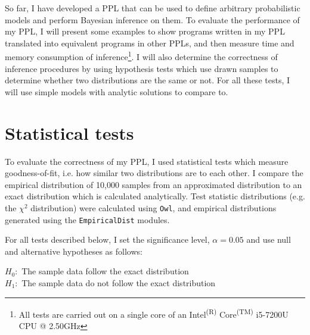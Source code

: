 




So far, I have developed a PPL that can be used to define arbitrary probabilistic models and perform Bayesian inference on them. To evaluate the performance of my PPL, I will present some examples to show programs written in my PPL translated into equivalent programs in other PPLs, and then measure time and memory consumption of inference\footnote{All tests are carried out on a single core of an Intel\textsuperscript{(R)} Core\textsuperscript{(TM)} i5-7200U CPU @ 2.50GHz}. I will also determine the correctness of inference procedures by using hypothesis tests which use drawn samples to determine whether two distributions are the same or not. For all these tests, I will use simple models with analytic solutions to compare to.


\section{Statistical tests}
To evaluate the correctness of my PPL, I used statistical tests which measure goodness-of-fit, i.e. how similar two distributions are to each other. I compare the empirical distribution of 10,000 samples from an approximated distribution to an exact distribution which is calculated analytically. Test statistic distributions (e.g. the $\chi^2$ distribution) were calculated using \texttt{Owl}, and empirical distributions generated using the \texttt{EmpiricalDist} modules.

For all tests described below, I set the significance level, $\alpha = 0.05$ and use null and alternative hypotheses as follows:

$H_0:$ The sample data follow the exact distribution\\
$H_1:$ The sample data do not follow the exact distribution

